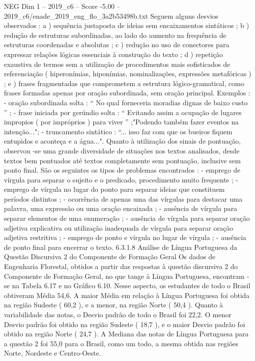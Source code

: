\begin{textsample}{NEG Dim 1 – 2019\_c6 – Score -5.00 – 2019\_c6/enade\_2019\_eng\_flo\_3a2b53498b.txt}
Seguem alguns desvios observados : a ) sequência justaposta de ideias sem encaixamentos sintáticos ; b ) redução de estruturas subordinadas, ao lado do aumento na frequência de estruturas coordenadas e absolutas ; c ) redução no uso de conectores para expressar relações lógicas essenciais à construção do texto ; d ) repetição exaustiva de termos sem a utilização de procedimentos mais sofisticados de referenciação ( hiperonímias, hiponímias, nominalizações, expressões metafóricas ) ; e ) frases fragmentadas que comprometem a estrutura lógico-gramatical, como frases formadas apenas por oração subordinada, sem oração principal.
Exemplos : - oração subordinada solta : “ No qual forneceria moradias dignas de baixo custo ” ; - frase iniciada por gerúndio solta : “ Evitando assim a ocupação de lugares impropios ( por impróprios ) para viver ” ;"Podendo também fazer eventos na intenção..."; - truncamento sintático : “... isso faz com que os bueiros fiquem entupidos e aconteça e a água...".
Quanto à utilização dos sinais de pontuação, observou -se uma grande diversidade de situações nos textos analisados, desde textos bem pontuados até textos completamente sem pontuação, inclusive sem ponto final.
São os seguintes os tipos de problemas encontrados : - emprego de vírgula para separar o sujeito e o predicado, procedimento muito frequente ; - emprego de vírgula no lugar do ponto para separar ideias que constituem períodos distintos ; - ocorrência de apenas uma das vírgulas para destacar uma palavra, uma expressão ou uma oração encaixada ; - ausência de vírgula para separar elementos de uma enumeração ; - ausência de vírgula para separar oração adjetiva explicativa ou utilização inadequada de vírgula para separar oração adjetiva restritiva ; - emprego de ponto e vírgula no lugar de vírgula ; - ausência de ponto final para encerrar o texto. 6.3.1.8 Análise de Língua Portuguesa da Questão Discursiva 2 do Componente de Formação Geral Os dados de Engenharia Florestal, obtidos a partir das respostas à questão discursiva 2 do Componente de Formação Geral, no que tange à Língua Portuguesa, encontram -se na Tabela 6.17 e no Gráfico 6.10.
Nesse aspecto, os estudantes de todo o Brasil obtiveram Média 54,6.
A maior Média em relação à Língua Portuguesa foi obtida na região Sudeste ( 60,2 ), e a menor, na região Norte ( 50,4 ).
Quanto à variabilidade das notas, o Desvio padrão de todo o Brasil foi 22,2.
O menor Desvio padrão foi obtido na região Sudeste ( 18,7 ), e o maior Desvio padrão foi obtido na região Norte ( 24,7 ).
A Mediana das notas de Língua Portuguesa para a questão 2 foi 55,0 para o Brasil, como um todo, a mesma obtida nas regiões Norte, Nordeste e Centro-Oeste.

\end{textsample}
